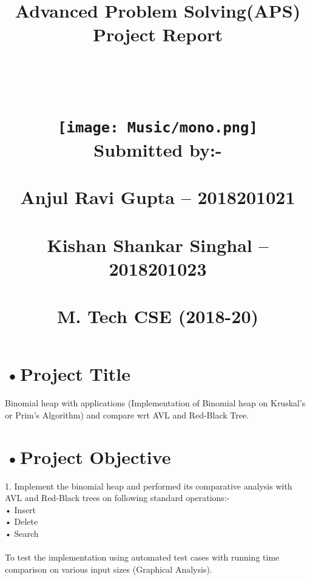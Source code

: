 \documentclass[10pt,a4paper]{article}
\title{
		\usefont{OT1}{bch}{b}{n}
		\normalfont \normalsize \textsc{} \\ [25pt]
		\horrule \\[0.4cm]
		\huge Advanced Problem Solving(APS) \\Project Report \\ \\
	\\ \\
	    	\texttt{[image: Music/mono.png]} 
		\\ Submitted by:- \\ \\
		Anjul Ravi Gupta – 2018201021\\
	\\Kishan Shankar Singhal – 2018201023 \\ \\
	M. Tech CSE (2018-20)
		\horrule \\[0.5cm]
		\date{\vspace{-5ex}}
}
\begin{document}
\maketitle

   
\section*{•Project Title}

      Binomial heap with applications (Implementation of Binomial heap on Kruskal’s or Prim’s Algorithm) and compare wrt AVL and Red-Black Tree.
      
\section*{•Project Objective}
	
	1. Implement the binomial heap and performed its comparative analysis with AVL and Red-Black trees on following standard operations:-\\
    • Insert\\
    • Delete\\
    • Search\\
\\To test the implementation using automated test cases with running time comparison on various input sizes (Graphical Analysis).\\
\end{document}
